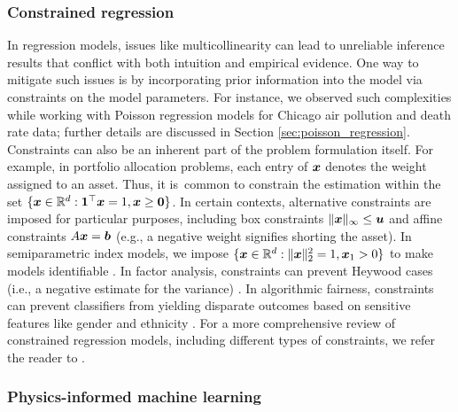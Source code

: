 \documentclass[aos]{imsart}
\numberwithin{equation}{section}
\theoremstyle{plain}
\begin{document}
\subsubsection{Constrained regression}
\label{sec_constrained_regression}
In regression models, issues like multicollinearity can lead to unreliable inference results that conflict with both intuition and empirical evidence. 
One way to mitigate such issues is by incorporating prior information into the model via constraints on the model parameters.
For instance, we observed such complexities while working with Poisson regression models for Chicago air pollution and death rate data; further details are discussed in Section \ref{sec:poisson_regression}.
Constraints can also be an inherent part of the problem formulation itself.
For example, in portfolio allocation problems, each entry of ${\boldsymbol{x}}$ denotes the weight assigned to an asset. Thus, it is~common to constrain the estimation within the set $\{{\boldsymbol{x}}\in\mathbb{R}^d: {\boldsymbol{1}}^\top {\boldsymbol{x}} = 1, {\boldsymbol{x}}\geq {\boldsymbol 0}\}$. In certain contexts, alternative constraints are imposed for particular purposes, including box constraints $\|{\boldsymbol{x}}\|_{\infty}\leq {\boldsymbol{u}}$ and affine constraints $A{\boldsymbol{x}} = {\boldsymbol{b}}$ \cite{Fan2007Variable, Fan2012Vast} (e.g., a negative weight signifies shorting the asset). In semiparametric index models, we impose $\{{\boldsymbol{x}}\in\mathbb{R}^d: \|{\boldsymbol{x}}\|_2^2=1, {\boldsymbol{x}}_1>0\}$ to make models identifiable \cite{Na2019High, Na2021High}. In factor analysis, constraints can prevent Heywood cases (i.e., a negative estimate for the variance) \cite{Shapiro1985Asymptotic}. In algorithmic fairness, constraints can prevent classifiers from yielding disparate outcomes based on sensitive features like gender and ethnicity \cite{Zafar2019Fairness}. 
For a more comprehensive review of constrained regression models, including different types of constraints, we refer the reader to \cite{Fan2012Vast, shapiro2000asymptotics, du2023high, sen1979asymptotic, Na2021High, dupacova1988asymptotic, Na2019High}.



\subsubsection{Physics-informed machine learning}
\end{document}
